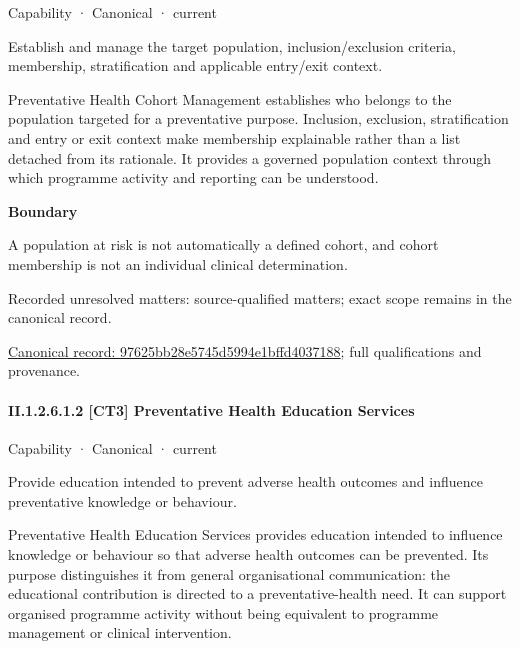 \label{element:97625bb28e5745d5994e1bffd4037188}
{\small Capability · Canonical · current}\par

Establish and manage the target population, inclusion/exclusion criteria, membership, stratification and applicable entry/exit context.



Preventative Health Cohort Management establishes who belongs to the population targeted for a preventative purpose. Inclusion, exclusion, stratification and entry or exit context make membership explainable rather than a list detached from its rationale. It provides a governed population context through which programme activity and reporting can be understood.



\textbf{Boundary}



A population at risk is not automatically a defined cohort, and cohort membership is not an individual clinical determination.


{\small Recorded unresolved matters: source-qualified matters; exact scope remains in the canonical record.}\par
{\footnotesize \href{../../../../continuum/strategy/capability/97625bb28e5745d5994e1bffd4037188.md}{Canonical record: 97625bb28e5745d5994e1bffd4037188}; full qualifications and provenance.}\par
\paragraph*{II.1.2.6.1.2 [CT3] Preventative Health Education Services}
\label{navigation:II.1.2.6.1.2}

\label{element:7541d9b3b65d47d286dabdc093cb0eed}
{\small Capability · Canonical · current}\par

Provide education intended to prevent adverse health outcomes and influence preventative knowledge or behaviour.



Preventative Health Education Services provides education intended to influence knowledge or behaviour so that adverse health outcomes can be prevented. Its purpose distinguishes it from general organisational communication: the educational contribution is directed to a preventative-health need. It can support organised programme activity without being equivalent to programme management or clinical intervention.



